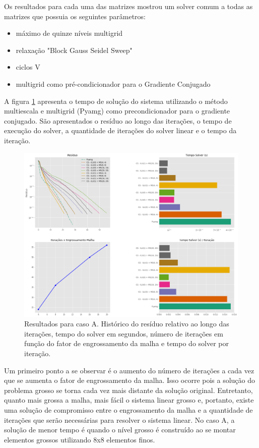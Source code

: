 Os resultados para cada uma das matrizes mostrou um solver comum a todas as matrizes que possuia os seguintes parâmetros:

\begin{itemize}
    \item máximo de quinze níveis multigrid
    \item relaxação "Block Gauss Seidel Sweep" 
    \item ciclos V
    \item multigrid como pré-condicionador para o Gradiente Conjugado
\end{itemize}

A figura \ref{fig:reservatorio100x100_1} apresenta o tempo de solução do sistema utilizando o método multiescala e multigrid (Pyamg) como precondicionador para o gradiente conjugado. São apresentados o resíduo ao longo das iterações, o tempo de execução do solver, a quantidade de iterações do solver linear e o tempo da iteração.

\begin{figure}[!htbp]
\label{fig:reservatorio100x100_1}
\centering
\includegraphics[width=\textwidth]{chap08/figs/reservatorio100x100_1.png}
\caption{Resultados para caso A. Histórico do resíduo relativo ao longo das iterações, tempo do solver em segundos, número de iterações em função do fator de engrossamento da malha e tempo do solver por iteração. }
\end{figure}

Um primeiro ponto a se observar é o aumento do número de iterações a cada vez que se aumenta o fator de engrossamento da malha. Isso ocorre pois a solução do problema grosso se torna cada vez mais distante da solução  original. Entretanto, quanto mais grossa a malha, mais fácil o sistema linear grosso e, portanto, existe uma solução de compromisso entre o engrossamento da malha e a quantidade de iterações que serão necessárias para resolver o sistema linear. No caso A, a solução de menor tempo é quando o nível grosso é construído ao se montar elementos grossos utilizando 8x8 elementos finos. 

